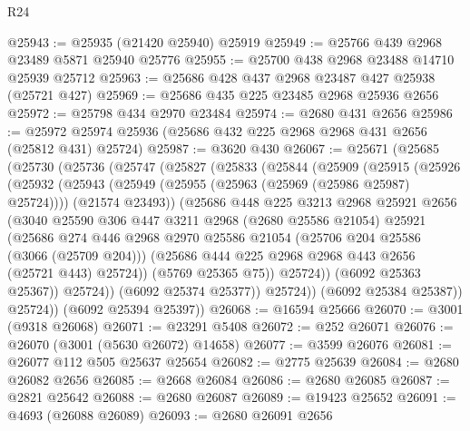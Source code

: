 \begin{lexlean}{R24}
\begin{coremodule}
@25943 := @25935 (@21420 @25940) @25919
@25949 := @25766 @439 @2968 @23489 @5871 @25940 @25776
@25955 := @25700 @438 @2968 @23488 @14710 @25939 @25712
@25963 := @25686 @428 @437 @2968 @23487 @427 @25938 (@25721 @427)
@25969 := @25686 @435 @225 @23485 @2968 @25936 @2656
@25972 := @25798 @434 @2970 @23484
@25974 := @2680 @431 @2656
@25986 := @25972 @25974 @25936 (@25686 @432 @225 @2968 @2968 @431 @2656 (@25812 @431) @25724)
@25987 := @3620 @430
@26067 := @25671
    (@25685
      (@25730
        (@25736
          (@25747
            (@25827
              (@25833
                (@25844
                  (@25909
                    (@25915
                      (@25926
                        (@25932
                          (@25943
                            (@25949 (@25955 (@25963 (@25969 (@25986 @25987) @25724))))
                            (@21574 @23493))
                          (@25686
                            @448
                            @225
                            @3213
                            @2968
                            @25921
                            @2656
                            (@3040
                              @25590
                              @306
                              @447
                              @3211
                              @2968
                              (@2680 @25586 @21054)
                              @25921
                              (@25686
                                @274
                                @446
                                @2968
                                @2970
                                @25586
                                @21054
                                (@25706 @204 @25586 (@3066 (@25709 @204)))
                                (@25686 @444 @225 @2968 @2968 @443 @2656 (@25721 @443) @25724))
                              (@5769 @25365 @75))
                            @25724))
                        (@6092 @25363 @25367))
                      @25724))
                  (@6092 @25374 @25377))
                @25724))
            (@6092 @25384 @25387))
          @25724))
      (@6092 @25394 @25397))
@26068 := @16594 @25666
@26070 := @3001 (@9318 @26068)
@26071 := @23291 @5408
@26072 := @252 @26071
@26076 := @26070 (@3001 (@5630 @26072) @14658)
@26077 := @3599 @26076
@26081 := @26077 @112 @505 @25637 @25654
@26082 := @2775 @25639
@26084 := @2680 @26082 @2656
@26085 := @2668 @26084
@26086 := @2680 @26085
@26087 := @2821 @25642
@26088 := @2680 @26087
@26089 := @19423 @25652
@26091 := @4693 (@26088 @26089)
@26093 := @2680 @26091 @2656

\end{coremodule}
\end{lexlean}
